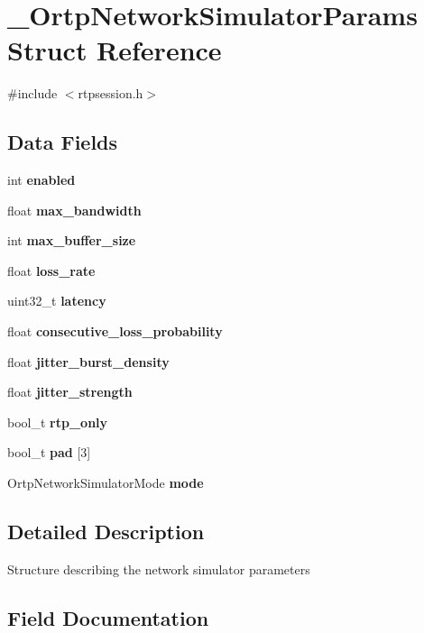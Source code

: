 \section{\+\_\+\+Ortp\+Network\+Simulator\+Params Struct Reference}
\label{struct__OrtpNetworkSimulatorParams}


{\ttfamily \#include $<$rtpsession.\+h$>$}

\subsection*{Data Fields}
\begin{DoxyCompactItemize}
\item 
int \textbf{ enabled}
\item 
float \textbf{ max\+\_\+bandwidth}
\item 
int \textbf{ max\+\_\+buffer\+\_\+size}
\item 
float \textbf{ loss\+\_\+rate}
\item 
uint32\+\_\+t \textbf{ latency}
\item 
float \textbf{ consecutive\+\_\+loss\+\_\+probability}
\item 
float \textbf{ jitter\+\_\+burst\+\_\+density}
\item 
float \textbf{ jitter\+\_\+strength}
\item 
\mbox{\label{struct__OrtpNetworkSimulatorParams_adad6988b153ff74c0b77f9fdb54af9a0}} 
bool\+\_\+t {\bfseries rtp\+\_\+only}
\item 
bool\+\_\+t \textbf{ pad} [3]
\item 
Ortp\+Network\+Simulator\+Mode \textbf{ mode}
\end{DoxyCompactItemize}


\subsection{Detailed Description}
Structure describing the network simulator parameters 

\subsection{Field Documentation}
\mbox{\label{struct__OrtpNetworkSimulatorParams_a21f8dab32e6a4827a0bdfa9910be5ffa}} 
